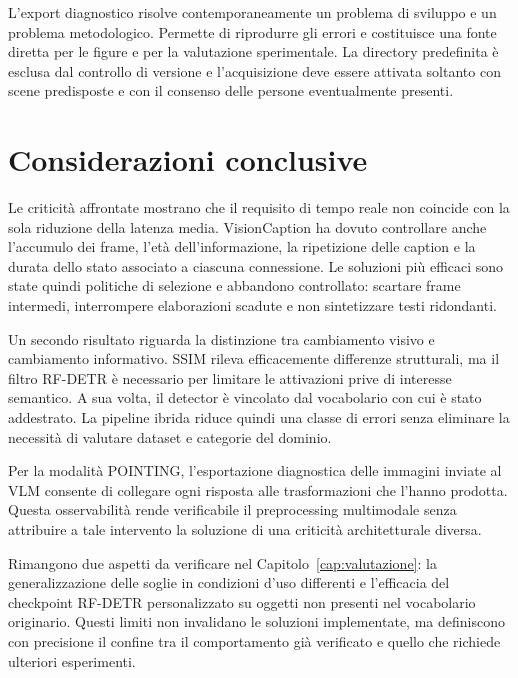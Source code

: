 L'export diagnostico risolve contemporaneamente un problema di sviluppo e un
problema metodologico. Permette di riprodurre gli errori e costituisce una
fonte diretta per le figure e per la valutazione sperimentale. La directory
predefinita è esclusa dal controllo di versione e l'acquisizione deve essere
attivata soltanto con scene predisposte e con il consenso delle persone
eventualmente presenti.

\section{Considerazioni conclusive}
\label{sec:problemi-conclusioni}

Le criticità affrontate mostrano che il requisito di tempo reale non coincide
con la sola riduzione della latenza media. VisionCaption ha dovuto controllare
anche l'accumulo dei frame, l'età dell'informazione, la ripetizione delle
caption e la durata dello stato associato a ciascuna connessione. Le soluzioni
più efficaci sono state quindi politiche di selezione e abbandono controllato:
scartare frame intermedi, interrompere elaborazioni scadute e non sintetizzare
testi ridondanti.

Un secondo risultato riguarda la distinzione tra cambiamento visivo e
cambiamento informativo. SSIM rileva efficacemente differenze strutturali, ma
il filtro RF-DETR è necessario per limitare le attivazioni prive di interesse
semantico. A sua volta, il detector è vincolato dal vocabolario con cui è
stato addestrato. La pipeline ibrida riduce quindi una classe di errori senza
eliminare la necessità di valutare dataset e categorie del dominio.

Per la modalità POINTING, l'esportazione diagnostica delle immagini inviate
al VLM consente di collegare ogni risposta alle trasformazioni che l'hanno
prodotta. Questa osservabilità rende verificabile il preprocessing
multimodale senza attribuire a tale intervento la soluzione di una criticità
architetturale diversa.

Rimangono due aspetti da verificare nel Capitolo~\ref{cap:valutazione}: la
generalizzazione delle soglie in condizioni d'uso differenti e l'efficacia
del checkpoint RF-DETR personalizzato su oggetti non presenti nel vocabolario
originario. Questi limiti non invalidano le soluzioni implementate, ma
definiscono con precisione il confine tra il comportamento già verificato e
quello che richiede ulteriori esperimenti.
